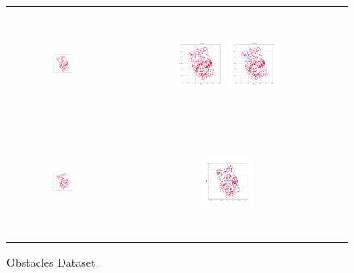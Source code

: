 \begin{figure}[htbp]
    \centering
    \begin{tabular}{ccc}
         \includegraphics[height=36mm,width=0.24\textwidth]{Images/simulation_obs/Data/1.png}
        & \includegraphics[height=36mm,width=0.24\textwidth]{Images/simulation_obs/Data/2.png}
         \includegraphics[height=36mm,width=0.24\textwidth]{Images/simulation_obs/Data/3.png}\\[-4pt]

        \includegraphics[height=36mm,width=0.24\textwidth]{Images/simulation_obs/Data/4.png}
        & \includegraphics[height=36mm,width=0.24\textwidth]{Images/simulation_obs/Data/5.png}

    \end{tabular}
    \caption{Obstacles Dataset.\label{fig:obstacles_dataset}}
\end{figure}



